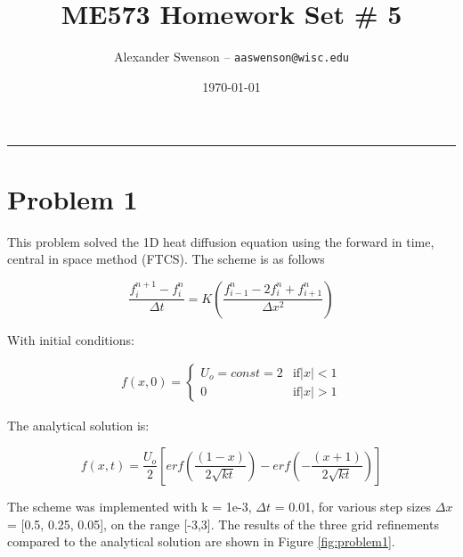 \documentclass[12pt]{article}
\title{ME573 Homework Set \# 5}
\author{Alexander Swenson -- \texttt{aaswenson@wisc.edu}}
\date{\today}
\begin{document}
  \maketitle

  \vspace{-0.3in}
  \noindent
  \rule{\linewidth}{0.4pt}

  \noindent
  

\section{Problem 1}

\noindent This problem solved the 1D heat diffusion equation using the forward in time, central in space method (FTCS). The scheme is as follows

\begin{equation}
\frac{f_i^{n+1} - f_i^n}{\Delta t}  = K \left(\frac{f_{i-1}^{n} - 2f_i^{n} + f_{i+1}^{n}}{\Delta x^2}\right) 
\label{eqn:ftcs_scheme}
\end{equation}

\noindent With initial conditions:

\begin{align*}
	f(x,0) = \begin{cases}
	U_o = const = 2 & \text{if} |x| < 1\\
	0 & \text{if} |x| > 1 
	\end{cases}
\end{align*}

\noindent The analytical solution is:

\begin{equation}
	f(x,t) = \frac{U_o}{2} \left[erf\left(\frac{(1-x)}{2\sqrt{kt}}\right) - erf\left(-\frac{(x+1)}{2\sqrt{kt}}\right)\right]
\end{equation}

\noindent The scheme was implemented with k = 1e-3, $\Delta t$ = 0.01, for various step sizes $\Delta x$ = [0.5, 0.25, 0.05], on the range [-3,3]. The results of the three grid refinements compared to the analytical solution are shown in Figure \ref{fig:problem1}.
\end{document}
